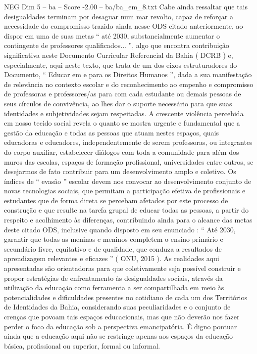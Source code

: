 \begin{textsample}{NEG Dim 5 – ba – Score -2.00 – ba/ba\_em\_8.txt}
Cabe ainda ressaltar que tais desigualdades terminam por desaguar num mar revolto, capaz de reforçar a necessidade do compromisso trazido ainda nesse ODS citado anteriormente, ao dispor em uma de suas metas “ até 2030, substancialmente aumentar o contingente de professores qualificados... ”, algo que encontra contribuição significativa neste Documento Curricular Referencial da Bahia ( DCRB ) e, especialmente, aqui neste texto, que trata de um dos eixos estruturadores do Documento, “ Educar em e para os Direitos Humanos ”, dada a sua manifestação de relevância no contexto escolar e do reconhecimento ao empenho e compromisso de professoras e professores/as para com cada estudante ou demais pessoas de seus círculos de convivência, ao lhes dar o suporte necessário para que suas identidades e subjetividades sejam respeitadas.
A crescente violência percebida em nosso tecido social revela o quanto se mostra urgente e fundamental que a gestão da educação e todas as pessoas que atuam nestes espaços, quais educadoras e educadores, independentemente de serem professoras, ou integrantes do corpo auxiliar, estabelecer diálogos com toda a comunidade para além dos muros das escolas, espaços de formação profissional, universidades entre outros, se desejarmos de fato contribuir para um desenvolvimento amplo e coletivo.
Os índices de “ evasão ” escolar devem nos convocar ao desenvolvimento conjunto de novas tecnologias sociais, que permitam a participação efetiva de profissionais e estudantes que de forma direta se percebam afetados por este processo de construção e que resulte na tarefa grupal de educar todas as pessoas, a partir do respeito e acolhimento às diferenças, contribuindo ainda para o alcance das metas deste citado ODS, inclusive quando disposto em seu enunciado : “ Até 2030, garantir que todas as meninas e meninos completem o ensino primário e secundário livre, equitativo e de qualidade, que conduza a resultados de aprendizagem relevantes e eficazes ” ( ONU, 2015 ).
As realidades aqui apresentadas são orientadoras para que coletivamente seja possível construir e propor estratégias de enfrentamento às desigualdades sociais, através da utilização da educação como ferramenta a ser compartilhada em meio às potencialidades e dificuldades presentes no cotidiano de cada um dos Territórios de Identidades da Bahia, considerando suas peculiaridades e o conjunto de crenças que povoam tais espaços educacionais, mas que não deverão nos fazer perder o foco da educação sob a perspectiva emancipatória.
É digno pontuar ainda que a educação aqui não se restringe apenas aos espaços da educação básica, profissional ou superior, formal ou informal.

\end{textsample}
